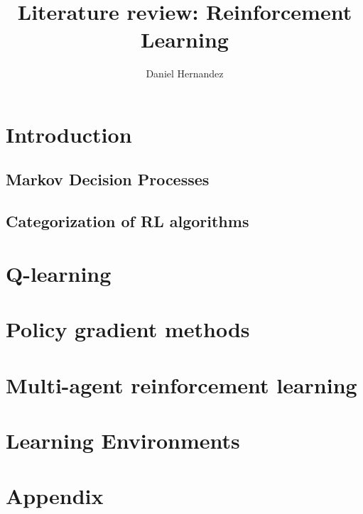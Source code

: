 \documentclass{article}
\title{\textbf{Literature review: Reinforcement Learning}}
\author{Daniel Hernandez}
\date{ }
\begin{document}
\maketitle

\tableofcontents

\newpage

% 
% 
\section{Introduction}


    \subsection{Markov Decision Processes}\label{section:markov-decision-processes}
    

    \subsection{Categorization of RL algorithms}
    
    
    
\section{Q-learning}\label{section:q-learning}

 
\section{Policy gradient methods}\label{section:policy-gradient-methods}

  
\section{Multi-agent reinforcement learning}


\section{Learning Environments}


\section{Appendix}




\end{document}
